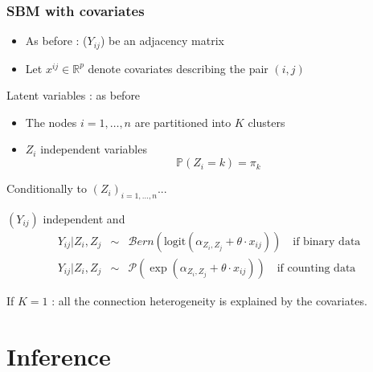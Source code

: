 \documentclass[compress,10pt]{beamer}
\begin{document}
\begin{frame} \frametitle{SBM with covariates}

\begin{itemize}
\item As before :  ($Y_{ij}$) be an adjacency matrix 
\item  Let   $x^{ij} \in \mathbb{R}^p$  denote covariates describing the pair $(i,j)$
\end{itemize}

\begin{block}{Latent variables : as before }
\begin{itemize}
\item The nodes $i= 1,\dots,n$ are partitioned into $K$ clusters
\item $Z_i$ independent variables
$$ \mathbb{P}(Z_i = k) = \pi_k$$
\end{itemize}
\end{block}
 
\begin{block}{Conditionally to $(Z_i)_{i=1,\dots,n}$... }

$(Y_{ij})$ independent and 
\begin{eqnarray*}
 Y_{ij}  | Z_i, Z_j&\sim&   \mathcal{B}ern(\mbox{logit}(\alpha_{Z_i,Z_j} + \theta \cdot x_{ij}) ) \quad \mbox {if binary data} \\
 Y_{ij}  | Z_i, Z_j  &\sim&  \mathcal{P}(\exp(\alpha_{Z_i,Z_j} + \theta  \cdot x_{ij}) ) \quad \mbox {if counting data} 
\end{eqnarray*}
\end{block}


If $K = 1$ : all the connection heterogeneity is explained by the covariates. 
 \end{frame}

 
 
 
 
 
 
\section{Inference}
\end{document}

